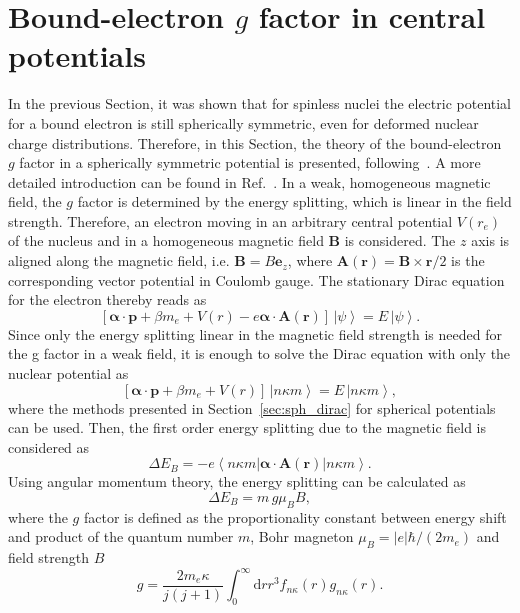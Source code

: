 \section{Bound-electron $g$ factor in central potentials}
\label{sec:gfac_intro}
In the previous Section, it was shown that for spinless nuclei the electric potential for a bound electron is still spherically symmetric, even for deformed nuclear charge distributions. Therefore, in this Section, the theory of the bound-electron $g$ factor in a spherically symmetric potential is presented, following~\cite{rose1961,Karshenboim2005}. A more detailed introduction can be found in Ref.~\cite{michel2015}. In a weak, homogeneous magnetic field, the $g$ factor is determined by the energy splitting, which is linear in the field strength. Therefore, an electron moving in an arbitrary central potential $V(r_e)$ of the nucleus and in a homogeneous magnetic field $\mathbf{B}$ is considered. The $z$ axis is aligned along the magnetic field, i.e. $\mathbf{B}=B\mathbf{e}_z$, where $\mathbf{A}(\mathbf{r})=\mathbf{B}\times \mathbf{r} /2$ is the corresponding vector potential in Coulomb gauge. The stationary Dirac equation for the electron thereby reads as
\begin{equation}
\left[\boldsymbol{\alpha}\cdot\mathbf{p}+\beta m_e + V(r) -e\boldsymbol{\alpha}\cdot\mathbf{A}(\mathbf{r})\right]\,\left|\psi\right> = E\,\left|\psi\right>.
\end{equation}
Since only the energy splitting linear in the magnetic field strength is needed for the g factor in a weak field, it is enough to solve the Dirac equation with only the nuclear potential as
\begin{equation}
\left[\boldsymbol{\alpha}\cdot\mathbf{p}+\beta m_e + V(r) \right]\,\left|n\kappa m\right> = E\,\left|n\kappa m\right>,
\end{equation}
where the methods presented in Section~\ref{sec:sph_dirac} for spherical potentials can be used. Then, the first order energy splitting due to the magnetic field is considered as
\begin{equation}
\Delta E_B = -e\left<n\kappa m\right|\boldsymbol{\alpha}\cdot\mathbf{A}(\mathbf{r})\left|n\kappa m\right>.
\end{equation}
Using angular momentum theory, the energy splitting can be calculated as $$\Delta E_B = m\, g \mu_B B,$$ where the $g$ factor is defined as the proportionality constant between energy shift and product of the quantum number $m$, Bohr magneton $\mu_B=|e|\hbar/(2m_e)$ and field strength $B$
\begin{equation}
g=\frac{2m_e\kappa}{j(j+1)}\int_0^\infty\mathrm{d}r r^3 f_{n\kappa}(r)g_{n\kappa}(r).
\label{eq:gfac_central}
\end{equation}
